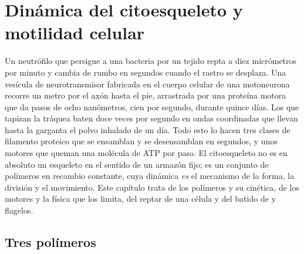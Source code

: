 \chapter{Dinámica del citoesqueleto y motilidad celular}\label{ch:b3:cytoskeleton-motility}

Un neutrófilo que persigue a una bacteria por un tejido repta a diez
micrómetros por minuto y cambia de rumbo en segundos cuando el rastro se
desplaza. Una vesícula de neurotransmisor fabricada en el cuerpo celular
de una motoneurona recorre un metro por el axón hasta el pie, arrastrada
por una proteína motora que da pasos de ocho nanómetros, cien por
segundo, durante quince días. Los  que tapizan la tráquea baten
doce veces por segundo en ondas coordinadas que llevan hasta la garganta
el polvo inhalado de un día. Todo esto lo hacen tres clases de filamento
proteico que se ensamblan y se desensamblan en segundos, y unos motores
que queman una molécula de ATP por paso. El citoesqueleto no es en
absoluto un esqueleto en el sentido de un armazón fijo; es un conjunto de
polímeros en recambio constante, cuya dinámica \emph{es} el mecanismo de
la forma, la división y el movimiento. Este capítulo trata de los
polímeros y su cinética, de los motores y la física que los limita, del
reptar de una célula y del batido de  y flagelos.

\section{Tres polímeros}

